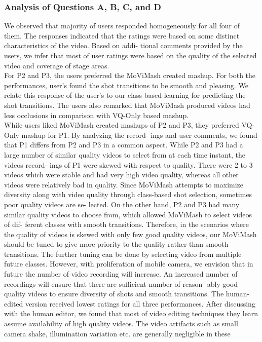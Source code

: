 \documentclass{sig-alternate}
\begin{document}
\subsubsection{Analysis of Questions A, B, C, and D}
We observed that majority of users responded homogeneously
for all four of them. The responses indicated that the ratings were
based on some distinct characteristics of the video. Based on addi-
tional comments provided by the users, we infer that most of user
ratings were based on the quality of the selected video and coverage
of stage areas.\\
For P2 and P3, the users preferred the MoViMash created mashup.
For both the performances, user's found the shot transitions to be
smooth and pleasing. We relate this response of the user's to our
class-based learning for predicting the shot transitions. The users
also remarked that MoViMash produced videos had less occlusions
in comparison with VQ-Only based mashup.\\
While users liked MoViMash created mashups of P2 and P3,
they preferred VQ-Only mashup for P1. By analyzing the record-
ings and user comments, we found that P1 differs from P2 and P3 in
a common aspect. While P2 and P3 had a large number of similar
quality videos to select from at each time instant, the videos record-
ings of P1 were skewed with respect to quality. There were 2 to 3
videos which were stable and had very high video quality, whereas
all other videos were relatively bad in quality. Since MoViMash
attempts to maximize diversity along with video quality through
class-based shot selection, sometimes poor quality videos are se-
lected.
On the other hand, P2 and P3 had many similar quality videos
to choose from, which allowed MoViMash to select videos of dif-
ferent classes with smooth transitions. Therefore, in the scenarios
where the quality of videos is skewed with only few good quality
videos, our MoViMash should be tuned to give more priority to
the quality rather than smooth transitions. The further tuning can
be done by selecting video from multiple future classes. However,
with proliferation of mobile camera, we envision that in future the
number of video recording will increase. An increased number of
recordings will ensure that there are sufficient number of reason-
ably good quality videos to ensure diversity of shots and smooth
transitions.
The human-edited version received lowest ratings for all three
performances. After discussing with the human editor, we found
that most of video editing techniques they learn assume availability
of high quality videos. The video artifacts such as small camera shake, illumination variation etc. are generally negligible in these
\end{document}

